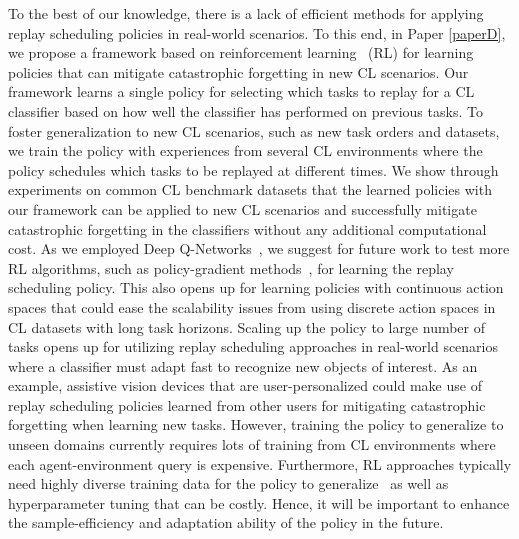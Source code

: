 To the best of our knowledge, there is a lack of efficient methods for applying replay scheduling policies in real-world scenarios. To this end, in Paper \ref{paperD}, we propose a framework based on reinforcement learning~\cite{sutton2018reinforcement} (RL) for learning policies that can mitigate catastrophic forgetting in new CL scenarios. Our framework learns a single policy for selecting which tasks to replay for a CL classifier based on how well the classifier has performed on previous tasks. To foster generalization to new CL scenarios, such as new task orders and datasets, we train the policy with experiences from several CL environments where the policy schedules which tasks to be replayed at different times. We show through experiments on common CL benchmark datasets that the learned policies with our framework can be applied to new CL scenarios and successfully mitigate catastrophic forgetting in the classifiers without any additional computational cost. As we employed Deep Q-Networks~\cite{mnih2013playing}, we suggest for future work to test more RL algorithms, such as policy-gradient methods~\cite{mnih2016asynchronous, schulman2017proximal}, for learning the replay scheduling policy. This also opens up for learning policies with continuous action spaces that could ease the scalability issues from using discrete action spaces in CL datasets with long task horizons. Scaling up the policy to large number of tasks opens up for utilizing replay scheduling approaches in real-world scenarios where a classifier must adapt fast to recognize new objects of interest. As an example, assistive vision devices that are user-personalized could make use of replay scheduling policies learned from other users for mitigating catastrophic forgetting when learning new tasks. However, training the policy to generalize to unseen domains currently requires lots of training from CL environments where each agent-environment query is expensive. Furthermore, RL approaches typically need highly diverse training data for the policy to generalize~\cite{zhang2018dissection, kirk2021survey} as well as hyperparameter tuning that can be costly. Hence, it will be important to enhance the sample-efficiency and adaptation ability of the policy in the future. 





